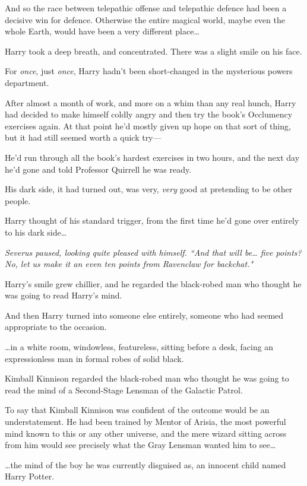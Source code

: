 And so the race between telepathic offense and telepathic defence had been a decisive win for defence. Otherwise the entire magical world, maybe even the whole Earth, would have been a very different place{\ldots}

Harry took a deep breath, and concentrated. There was a slight smile on his face.

For \emph{once}, just \emph{once}, Harry hadn't been short-changed in the mysterious powers department.

After almost a month of work, and more on a whim than any real hunch, Harry had decided to make himself coldly angry and then try the book's Occlumency exercises again. At that point he'd mostly given up hope on that sort of thing, but it had still seemed worth a quick try—

He'd run through all the book's hardest exercises in two hours, and the next day he'd gone and told Professor Quirrell he was ready.

His dark side, it had turned out, was very, \emph{very} good at pretending to be other people.

Harry thought of his standard trigger, from the first time he'd gone over entirely to his dark side{\ldots}

\emph{Severus paused, looking quite pleased with himself. ``And that will be{\ldots} five points? No, let us make it an even ten points from Ravenclaw for backchat."}

Harry's smile grew chillier, and he regarded the black-robed man who thought he was going to read Harry's mind.

And then Harry turned into someone else entirely, someone who had seemed appropriate to the occasion.

{\ldots}in a white room, windowless, featureless, sitting before a desk, facing an expressionless man in formal robes of solid black.

Kimball Kinnison regarded the black-robed man who thought he was going to read the mind of a Second-Stage Lensman of the Galactic Patrol.

To say that Kimball Kinnison was confident of the outcome would be an understatement. He had been trained by Mentor of Arisia, the most powerful mind known to this or any other universe, and the mere wizard sitting across from him would see precisely what the Gray Lensman wanted him to see{\ldots}

{\ldots}the mind of the boy he was currently disguised as, an innocent child named Harry Potter.

